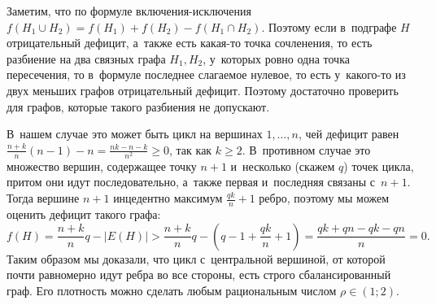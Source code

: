 \documentclass{article}
\theoremstyle{definition}
\theoremstyle{remark}
\renewcommand{\ge}{\geqslant}
\begin{document}
Заметим, что по формуле включения-исключения $f(H_1 \cup H_2) = f(H_1) + f(H_2) - f(H_1 \cap H_2)$.
Поэтому если в~подграфе $H$ отрицательный дефицит, а~также есть какая-то точка сочленения, то есть
разбиение на два связных графа $H_1, H_2$, у~которых ровно одна точка пересечения, то в~формуле
последнее слагаемое нулевое, то есть у~какого-то из двух меньших графов отрицательный дефицит.
Поэтому достаточно проверить для графов, которые такого разбиения не допускают.

В~нашем случае это может быть цикл на вершинах $1, \ldots, n$, чей дефицит равен $\frac{n + k}{n}
(n - 1) - n = \frac{nk - n - k}{n^2} \ge 0$, так как $k \ge 2$. В~противном случае это множество
вершин, содержащее точку $n + 1$ и~несколько (скажем $q$) точек цикла, притом они идут
последовательно, а~также первая и~последняя связаны с~$n + 1$. Тогда вершине $n + 1$ инцедентно
максимум $\frac{qk}{n} + 1$ ребро, поэтому мы можем оценить дефицит такого графа:
$$ f(H) = \frac{n+k}{n} q - |E(H)| > \frac{n+k}{n}q - (q - 1 + \frac{qk}{n}+1) = \frac{qk + qn - qk
- qn}{n} = 0.$$
Таким образом мы доказали, что цикл с~центральной вершиной, от которой почти равномерно идут ребра
во все стороны, есть строго сбалансированный граф. Его плотность можно сделать любым рациональным
числом $\rho \in (1; 2)$.
\end{document}
